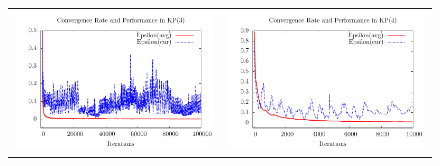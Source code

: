 \documentclass{aamas2014}
\begin{document}
\begin{figure}[t]
\begin{center}
\begin{tabular}{cc}
\hspace{-0.6cm}\includegraphics[scale=0.7]{figs/sfrd3-conv}    & \includegraphics[scale=0.7]{figs/sfrd4-conv} \\

\end{tabular}
\end{center}
\end{figure}
\end{document}
